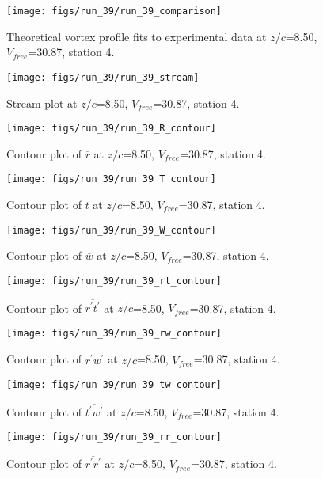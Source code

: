 \begin{figure}[H]
\centering
\texttt{[image: figs/run\_39/run\_39\_comparison]}
\caption{Theoretical vortex profile fits to experimental data at $z/c$=8.50, $V_{free}$=30.87, station 4.}
\end{figure}


\begin{figure}[H]
\centering
\texttt{[image: figs/run\_39/run\_39\_stream]}
\caption{Stream plot at $z/c$=8.50, $V_{free}$=30.87, station 4.}
\end{figure}


\begin{figure}[H]
\centering
\texttt{[image: figs/run\_39/run\_39\_R\_contour]}
\caption{Contour plot of $\overline{r}$ at $z/c$=8.50, $V_{free}$=30.87, station 4.}
\end{figure}


\begin{figure}[H]
\centering
\texttt{[image: figs/run\_39/run\_39\_T\_contour]}
\caption{Contour plot of $\overline{t}$ at $z/c$=8.50, $V_{free}$=30.87, station 4.}
\end{figure}


\begin{figure}[H]
\centering
\texttt{[image: figs/run\_39/run\_39\_W\_contour]}
\caption{Contour plot of $\overline{w}$ at $z/c$=8.50, $V_{free}$=30.87, station 4.}
\end{figure}


\begin{figure}[H]
\centering
\texttt{[image: figs/run\_39/run\_39\_rt\_contour]}
\caption{Contour plot of $\overline{r^\prime t^\prime}$ at $z/c$=8.50, $V_{free}$=30.87, station 4.}
\end{figure}


\begin{figure}[H]
\centering
\texttt{[image: figs/run\_39/run\_39\_rw\_contour]}
\caption{Contour plot of $\overline{r^\prime w^\prime}$ at $z/c$=8.50, $V_{free}$=30.87, station 4.}
\end{figure}


\begin{figure}[H]
\centering
\texttt{[image: figs/run\_39/run\_39\_tw\_contour]}
\caption{Contour plot of $\overline{t^\prime w^\prime}$ at $z/c$=8.50, $V_{free}$=30.87, station 4.}
\end{figure}


\begin{figure}[H]
\centering
\texttt{[image: figs/run\_39/run\_39\_rr\_contour]}
\caption{Contour plot of $\overline{r^\prime r^\prime}$ at $z/c$=8.50, $V_{free}$=30.87, station 4.}
\end{figure}


